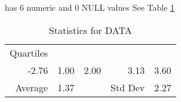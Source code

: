 \item[DATA] has 6 numeric and 0 NULL values
See Table \ref{tab:DATA}
\begin{table}[ht]
\caption{Statistics for DATA} \label{tab:DATA}
\centering
\begin{tabular}{|rrrrr|}
\hline
Quartiles & & & &  \\
-2.76 & 1.00 & 2.00 & 3.13 & 3.60 \\
\hline
Average & 1.37 & & Std Dev & 2.27 \\
\hline
\end{tabular}
\end{table}
